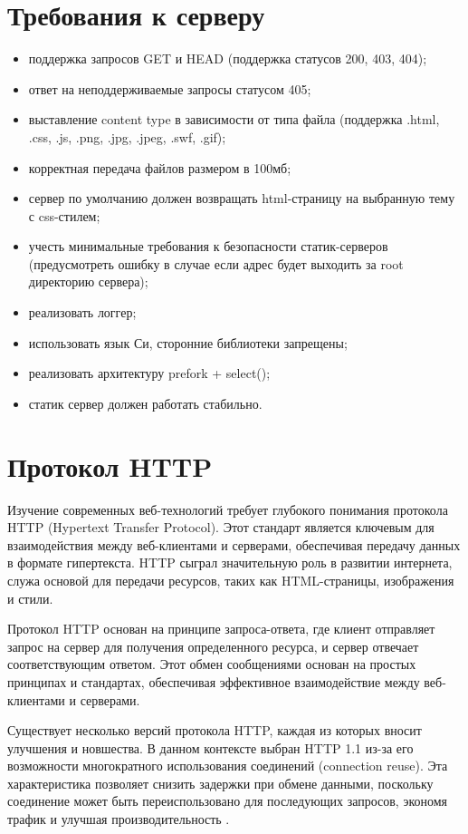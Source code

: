 \documentclass{bmstu}
\begin{document}
\section{Требования к серверу}

\begin{itemize}
	\item поддержка запросов GET и HEAD (поддержка статусов 200, 403, 404);
	\item ответ на неподдерживаемые запросы статусом 405;
	\item выставление content type в зависимости от типа файла (поддержка .html, .css, .js, .png, .jpg, .jpeg, .swf, .gif);
	\item корректная передача файлов размером в 100мб;
	\item сервер по умолчанию должен возвращать html-страницу на выбранную тему с css-стилем;
	\item учесть минимальные требования к безопасности статик-серверов (предусмотреть ошибку в случае если адрес будет выходить за root директорию сервера);
	\item реализовать логгер;
	\item использовать язык Си, сторонние библиотеки запрещены;
	\item реализовать архитектуру prefork + select();
	\item статик сервер должен работать стабильно.
\end{itemize}

\section{Протокол HTTP}

Изучение современных веб-технологий требует глубокого понимания протокола HTTP (Hypertext Transfer Protocol). Этот стандарт является ключевым для взаимодействия между веб-клиентами и серверами, обеспечивая передачу данных в формате гипертекста. HTTP сыграл значительную роль в развитии интернета, служа основой для передачи ресурсов, таких как HTML-страницы, изображения и стили.

Протокол HTTP основан на принципе запроса-ответа, где клиент отправляет запрос на сервер для получения определенного ресурса, и сервер отвечает соответствующим ответом. Этот обмен сообщениями основан на простых принципах и стандартах, обеспечивая эффективное взаимодействие между веб-клиентами и серверами.

Существует несколько версий протокола HTTP, каждая из которых вносит улучшения и новшества. 
В данном контексте выбран HTTP 1.1 из-за его возможности многократного использования соединений 
(connection reuse). Эта характеристика позволяет снизить задержки при обмене данными, поскольку 
соединение может быть переиспользовано для последующих запросов, экономя трафик и улучшая производительность \cite{tanenbaum2024}. 
\end{document}
